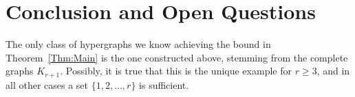 \documentclass[reqno,12pt,epsf]{amsart}
\def\per{\mbox{per}}
\def\deg{\mbox{deg}}
\begin{document}
%
%
%

\section{Conclusion and Open Questions}

The only class of hypergraphs we know achieving the bound in Theorem~\ref{Thm:Main} is the one constructed above, stemming from the complete graphs $K_{r+1}$. Possibly, it is true that this is the unique example for $r\ge 3$, and in all other cases a set $\{1,2,\ldots,r\}$ is sufficient.
\end{document}
